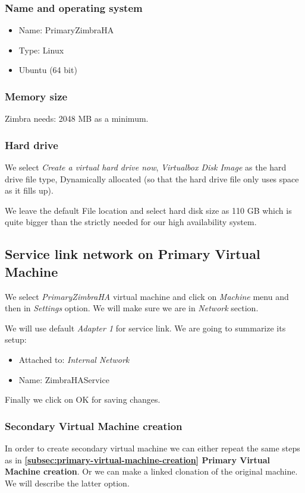 \subsubsection {Name and operating system}
\begin{itemize}
  \item Name: PrimaryZimbraHA
  \item Type: Linux
  \item Ubuntu (64 bit)
\end{itemize}

\subsubsection {Memory size}
Zimbra needs: 2048 MB as a minimum.
\subsubsection {Hard drive}
We select \textit{Create a virtual hard drive now}, \textit{Virtualbox Disk Image} as the hard drive file type, Dynamically allocated (so that the hard drive file only uses space as it fills up).

We leave the default File location and select hard disk size as 110 GB which is quite bigger than the strictly needed for our high availability system.

\subsection {\label{subsec:service-link-primary}Service link network on Primary Virtual Machine}
We select \textit{PrimaryZimbraHA} virtual machine and click on \textit{Machine} menu and then in \textit{Settings} option. We will make sure we are in \textit{Network} section.

We will use default \textit{Adapter 1} for service link. We are going to summarize its setup:
\begin{itemize}
  \item Attached to: \textit{Internal Network}
  \item Name: ZimbraHAService
\end{itemize}

Finally we click on OK for saving changes.

\subsubsection {Secondary Virtual Machine creation}
In order to create secondary virtual machine we can either repeat the same steps as in \textbf{\ref{subsec:primary-virtual-machine-creation} Primary Virtual Machine creation}. Or we can make a linked clonation of the original machine. We will describe the latter option.

